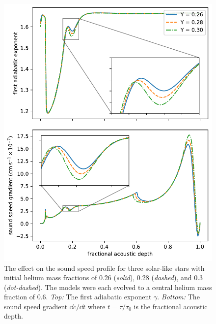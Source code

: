 
\begin{figure}
    \centering
    \includegraphics{figures/helium-ionisation-sound-speed.pdf}
    \caption[The effect on the sound speed profile for three solar-like stars with initial helium mass fractions of 0.26, 0.28, and 0.3.]{The effect on the sound speed profile for three solar-like stars with initial helium mass fractions of 0.26 (\emph{solid}), 0.28 (\emph{dashed}), and 0.3 (\emph{dot-dashed}). The models were each evolved to a central helium mass fraction of 0.6. \emph{Top:} The first adiabatic exponent \(\gamma\). \emph{Bottom:} The sound speed gradient \(\dd c/\dd t\) where \(t = \tau/\tau_0\) is the fractional acoustic depth.}
    \label{fig:gamma-sound-speed}
\end{figure}

